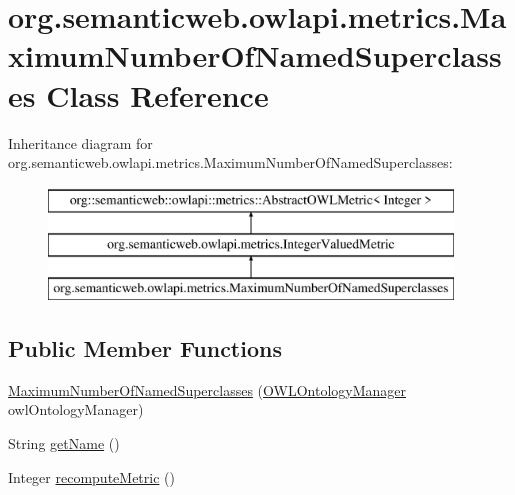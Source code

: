 \hypertarget{classorg_1_1semanticweb_1_1owlapi_1_1metrics_1_1_maximum_number_of_named_superclasses}{\section{org.\-semanticweb.\-owlapi.\-metrics.\-Maximum\-Number\-Of\-Named\-Superclasses Class Reference}
\label{classorg_1_1semanticweb_1_1owlapi_1_1metrics_1_1_maximum_number_of_named_superclasses}
}
Inheritance diagram for org.\-semanticweb.\-owlapi.\-metrics.\-Maximum\-Number\-Of\-Named\-Superclasses\-:\begin{figure}[H]
\begin{center}
\leavevmode
\includegraphics[height=3.000000cm]{classorg_1_1semanticweb_1_1owlapi_1_1metrics_1_1_maximum_number_of_named_superclasses}
\end{center}
\end{figure}
\subsection*{Public Member Functions}
\begin{DoxyCompactItemize}
\item 
\hyperlink{classorg_1_1semanticweb_1_1owlapi_1_1metrics_1_1_maximum_number_of_named_superclasses_aa3d0885ced1b7f85ee76b81b89eaa504}{Maximum\-Number\-Of\-Named\-Superclasses} (\hyperlink{interfaceorg_1_1semanticweb_1_1owlapi_1_1model_1_1_o_w_l_ontology_manager}{O\-W\-L\-Ontology\-Manager} owl\-Ontology\-Manager)
\item 
String \hyperlink{classorg_1_1semanticweb_1_1owlapi_1_1metrics_1_1_maximum_number_of_named_superclasses_aa1567a9619a4c43a1ea0dd2074041ceb}{get\-Name} ()
\item 
Integer \hyperlink{classorg_1_1semanticweb_1_1owlapi_1_1metrics_1_1_maximum_number_of_named_superclasses_a20e31697b79a787daa3845f96a2e7d9d}{recompute\-Metric} ()
\end{DoxyCompactItemize}
